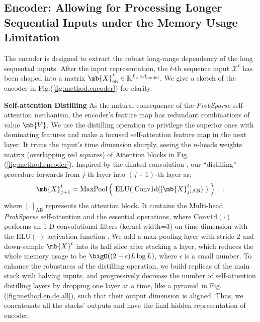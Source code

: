 \subsection{Encoder: Allowing for Processing Longer Sequential Inputs under the Memory Usage Limitation}
\label{sec:method.transformer.encoder}
The encoder is designed to extract the robust long-range dependency of the long sequential inputs.
After the input representation, the $t$-th sequence input $\mathcal{X}^t$ has been shaped into a matrix $\mb{X}^t_{\textrm{en}} \in \mathbb{R}^{L_x \times d_{\textrm{model}}}$. We give a sketch of the encoder in Fig.(\ref{fig:method.encoder}) for clarity.

\textbf{Self-attention Distilling} As the natural consequence of the \emph{ProbSparse} self-attention mechanism, the encoder's feature map has redundant combinations of value $\mb{V}$. We use the distilling operation to privilege the superior ones with dominating features and make a focused self-attention feature map in the next layer. It trims the input's time dimension sharply, seeing the $n$-heads weights matrix (overlapping red squares) of Attention blocks in Fig.(\ref{fig:method.encoder}). Inspired by the dilated convolution \cite{yu2017dilated, gupta2017dilated}, our ``distilling'' procedure forwards from $j$-th layer into $(j+1)$-th layer as:
\begin{equation}
\label{eq:method.distilling}
\mb{X}^t_{j+1}=
    \mathrm{MaxPool}\left(~
    \mathrm{ELU}(~
    \mathrm{Conv1d}(
    [\mb{X}^t_{j}]_{\mathrm{AB}}
    )~)~\right) \quad, 
\end{equation}
where $[\cdot]_{\text{{AB}}}$ represents the attention block. It contains the Multi-head \emph{ProbSparse} self-attention and the essential operations, where $\textrm{Conv1d}(\cdot)$ performs an 1-D convolutional filters (kernel width=3) on time dimension with the $\textrm{ELU}(\cdot)$ activation function \cite{clevert2015fast}. We add a max-pooling layer with stride 2 and down-sample $\mb{X}^t$ into its half slice after stacking a layer, which reduces the whole memory usage to be $\bigO((2-\epsilon) L \log L)$, where $\epsilon$ is a small number. To enhance the robustness of the distilling operation, we build replicas of the main stack with halving inputs, and progressively decrease the number of self-attention distilling layers by dropping one layer at a time, like a pyramid in Fig.(\ref{fig:method.en.de.all}), such that their output dimension is aligned. Thus, we concatenate all the stacks' outputs and have the final hidden representation of encoder.

